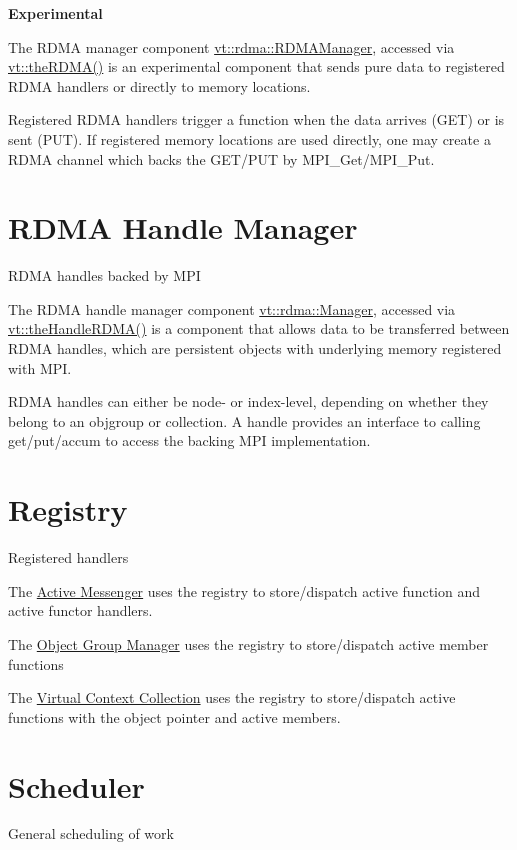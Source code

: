  {\bfseries Experimental}

The R\+D\+MA manager component {\ttfamily \hyperlink{structvt_1_1rdma_1_1_r_d_m_a_manager}{vt\+::rdma\+::\+R\+D\+M\+A\+Manager}}, accessed via {\ttfamily \hyperlink{namespacevt_a68b8410bc2b86d3b5228d7dbb6b40bac}{vt\+::the\+R\+D\+M\+A()}} is an experimental component that sends pure data to registered R\+D\+MA handlers or directly to memory locations.

Registered R\+D\+MA handlers trigger a function when the data arrives (G\+ET) or is sent (P\+UT). If registered memory locations are used directly, one may create a R\+D\+MA channel which backs the G\+E\+T/\+P\+UT by {\ttfamily M\+P\+I\+\_\+\+Get}/{\ttfamily M\+P\+I\+\_\+\+Put}. \hypertarget{rdmahandle}{}\section{R\+D\+MA Handle Manager}\label{rdmahandle}
R\+D\+MA handles backed by M\+PI

The R\+D\+MA handle manager component {\ttfamily \hyperlink{structvt_1_1rdma_1_1_manager}{vt\+::rdma\+::\+Manager}}, accessed via {\ttfamily \hyperlink{namespacevt_aecb87ec2c40b5b7fc57ba4cf8ea838b0}{vt\+::the\+Handle\+R\+D\+M\+A()}} is a component that allows data to be transferred between R\+D\+MA handles, which are persistent objects with underlying memory registered with M\+PI.

R\+D\+MA handles can either be node-\/ or index-\/level, depending on whether they belong to an objgroup or collection. A handle provides an interface to calling get/put/accum to access the backing M\+PI implementation. \hypertarget{registry}{}\section{Registry}\label{registry}
Registered handlers


\begin{DoxyItemize}
\item The \hyperlink{active-messenger}{Active Messenger} uses the registry to store/dispatch active function and active functor handlers.
\item The \hyperlink{objgroup}{Object Group Manager} uses the registry to store/dispatch active member functions
\item The \hyperlink{collection}{Virtual Context Collection} uses the registry to store/dispatch active functions with the object pointer and active members. 
\end{DoxyItemize}\hypertarget{scheduler}{}\section{Scheduler}\label{scheduler}
General scheduling of work

